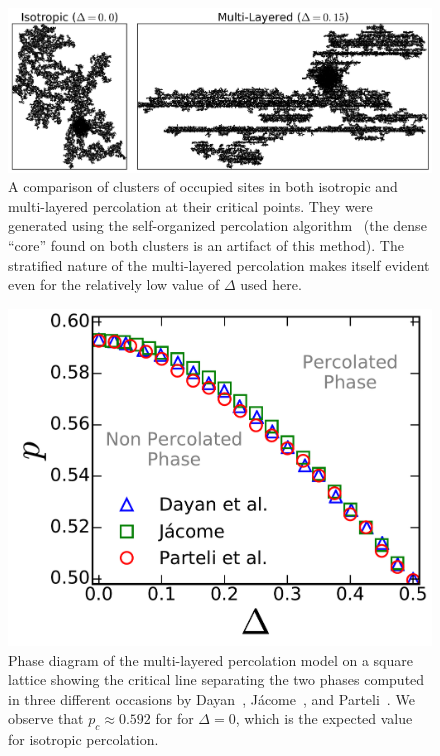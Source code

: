 \begin{figure}
\begin{center}
    \includegraphics[width=\textwidth]{chapters/ch5-anis/figs/mlp_cluster}
\end{center}
\caption{A comparison of clusters of occupied sites in both isotropic and
    multi-layered percolation at their critical points. They were generated
    using the self-organized percolation algorithm~\cite{Parteli2010} (the
    dense ``core'' found on both clusters is an artifact of this method). The
    stratified nature of the multi-layered percolation makes itself evident
    even for the relatively low value of $\Delta$ used here.}
\label{fig:mlp_cluster}
\end{figure}

\begin{figure}
\begin{center}
    \includegraphics[scale=0.4]{chapters/ch5-anis/figs/mlp_ps0}
\end{center}
\caption{Phase diagram of the multi-layered percolation model on a square
    lattice showing the critical line separating the two phases computed in
    three different occasions by Dayan~\cite{Dayan1991},
    J\'acome~\cite{Samyr2009}, and Parteli~\cite{Parteli2010}. We observe that
    $p_c\approx0.592$ for for $\Delta=0$, which is the expected value for
    isotropic percolation.}
\label{fig:mlp_ps0}
\end{figure}
